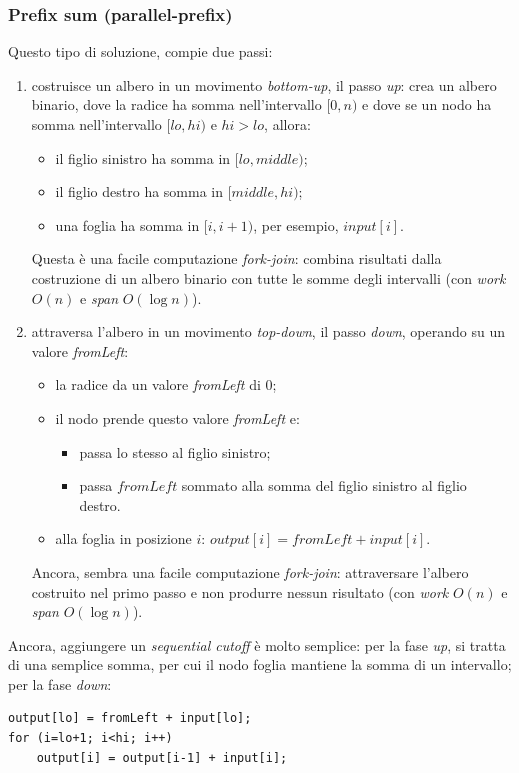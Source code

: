 \subsubsection{Prefix sum (parallel-prefix)}
Questo tipo di soluzione, compie due passi:
\begin{enumerate}
	\item costruisce un albero in un movimento \textit{bottom-up}, il passo \textit{up}: crea un albero binario, dove la radice ha somma nell'intervallo $[0,n)$ e dove se un nodo ha somma nell'intervallo $[lo, hi)$ e $hi>lo$, allora:
	\begin{itemize}
		\item il figlio sinistro ha somma in $[lo, middle)$;
		\item il figlio destro ha somma in $[middle, hi)$;
		\item una foglia ha somma in $[i, i+1)$, per esempio, $input[i]$.
	\end{itemize}
	Questa è una facile computazione \textit{fork-join}: combina risultati dalla costruzione di un albero binario con tutte le somme degli intervalli (con \textit{work} $O(n)$ e \textit{span} $O(\log{n})$).
	\item attraversa l'albero in un movimento \textit{top-down}, il passo \textit{down}, operando su un valore \textit{fromLeft}:
	\begin{itemize}
		\item la radice da un valore \textit{fromLeft} di $0$;
		\item il nodo prende questo valore \textit{fromLeft} e:
		\begin{itemize}
			\item passa lo stesso al figlio sinistro;
			\item passa $fromLeft$ sommato alla somma del figlio sinistro al figlio destro.
		\end{itemize}
		\item alla foglia in posizione $i$: $output[i] = fromLeft + input[i]$.
	\end{itemize}
	Ancora, sembra una facile computazione \textit{fork-join}: attraversare l'albero costruito nel primo passo e non produrre nessun risultato (con \textit{work} $O(n)$ e \textit{span} $O(\log{n})$).
\end{enumerate}
Ancora, aggiungere un \textit{sequential cutoff} è molto semplice: per la fase \textit{up}, si tratta di una semplice somma, per cui il nodo foglia mantiene la somma di un intervallo; per la fase \textit{down}:
\begin{lstlisting}
output[lo] = fromLeft + input[lo];
for (i=lo+1; i<hi; i++)
	output[i] = output[i-1] + input[i];
\end{lstlisting}

